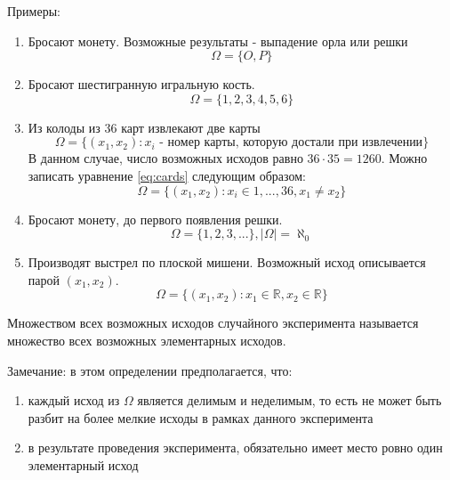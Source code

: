 \documentclass[a4paper, 12pt]{report}
\begin{document}
			Примеры:
			\begin{enumerate}
				\item Бросают монету. Возможные результаты - выпадение орла или решки
				\begin{equation}
					\Omega=\{O, P\}
				\end{equation}
				
				\item Бросают шестигранную игральную кость.
				\begin{equation}
					\Omega=\{1, 2, 3, 4, 5, 6\}
				\end{equation}
			
				\item Из колоды из 36 карт извлекают две карты
				\begin{equation}
					\label{eq:cards}
					\Omega=\{(x_1, x_2): x_i\text{ - номер карты, которую достали при извлечении}\}
				\end{equation}
				В данном случае, число возможных исходов равно $36\cdot 35=1260$. Можно записать уравнение \ref{eq:cards} следующим образом:
				\begin{equation}
					\Omega=\{(x_1, x_2): x_i\in {1,...,36}, x_1\ne x_2\}
				\end{equation}
			
				\item Бросают монету, до первого появления решки. 
				\begin{equation}
					\Omega=\{1,2,3,...\}, |\Omega|=\aleph_0
				\end{equation}
			
				\item Производят выстрел по плоской мишени. Возможный исход описывается парой $(x_1,x_2)$.
				\begin{equation}
					\Omega=\{(x_1, x_2): x_1\in\mathbb{R},x_2\in\mathbb{R}\}
				\end{equation}
			\end{enumerate}
		
			Множеством всех возможных исходов случайного эксперимента называется множество всех возможных элементарных исходов.
			
			Замечание: в этом определении предполагается, что:
			\begin{enumerate}
				\item каждый исход из $\Omega$ является делимым и неделимым, то есть не может быть разбит на более мелкие исходы в рамках данного эксперимента
				\item в результате проведения эксперимента, обязательно имеет место ровно один элементарный исход
			\end{enumerate}
		
\end{document}

